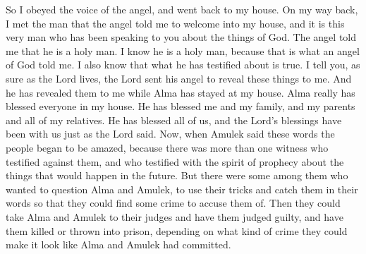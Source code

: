 So I obeyed the voice of the angel, and went back to my house. On my way back, I met the man that the angel told me to welcome into my house, and it is this very man who has been speaking to you about the things of God.
\bverse \iffalse And the angel said unto me he is a holy man; wherefore I know he is a holy man because it was said by an angel of God. \fi
The angel told me that he is a holy man. I know he is a holy man, because that is what an angel of God told me.
\bverse \iffalse And again, I know that the things whereof he hath testified are true; for behold I say unto you, that as the Lord liveth, even so has he sent his angel to make these things manifest unto me; and this he has done while this Alma hath dwelt at my house. \fi
I also know that what he has testified about is true. I tell you, as sure as the Lord lives, the Lord sent his angel to reveal these things to me. And he has revealed them to me while Alma has stayed at my house.
\bverse \iffalse For behold, he hath blessed mine house, he hath blessed me, and my women, and my children, and my father and my kinsfolk; yea, even all my kindred hath he blessed, and the blessing of the Lord hath rested upon us according to the words which he spake. \fi
Alma really has blessed everyone in my house. He has blessed me and my family, and my parents and all of my relatives. He has blessed all of us, and the Lord's blessings have been with us just as the Lord said.
\bverse \iffalse And now, when Amulek had spoken these words the people began to be astonished, seeing there was more than one witness who testified of the things whereof they were accused, and also of the things which were to come, according to the spirit of prophecy which was in them. \fi
Now, when Amulek said these words the people began to be amazed, because there was more than one witness who testified against them, and who testified with the spirit of prophecy about the things that would happen in the future.
\bverse \iffalse Nevertheless, there were some among them who thought to question them, that by their cunning devices they might catch them in their words, that they might find witness against them, that they might deliver them to their judges that they might be judged according to the law, and that they might be slain or cast into prison, according to the crime which they could make appear or witness against them. \fi
But there were some among them who wanted to question Alma and Amulek, to use their tricks and catch them in their words so that they could find some crime to accuse them of. Then they could take Alma and Amulek to their judges and have them judged guilty, and have them killed or thrown into prison, depending on what kind of crime they could make it look like Alma and Amulek had committed.
